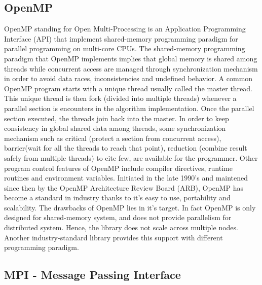 



\subsection{OpenMP}


OpenMP standing for Open Multi-Processing is an Application Programming Interface (API) that implement shared-memory programming paradigm for parallel programming on multi-core CPUs. The shared-memory programming paradigm that OpenMP implements implies that global memory is shared among threads while concurrent access are managed through synchronization mechanism in order to avoid data races, inconsistencies and undefined behavior. A common OpenMP program starts with a unique thread usually called the master thread. This unique thread is then fork (divided into multiple threads) whenever a parallel section is encounters in the algorithm implementation. Once the parallel section executed, the threads join back into the master. In order to keep consistency in global shared data among threads, some synchronization mechanism such as critical (protect a section from concurrent access), barrier(wait for all the threads to reach that point), reduction (combine result safely from multiple threads) to cite few, are available for the programmer. Other program control features of OpenMP include compiler directives, runtime routines and environment variables. Initiated in the late 1990's and maintened since then by the OpenMP Architecture Review Board (ARB), OpenMP has become a standard in industry thanks to it's easy to use, portability and scalability. The drawbacks of OpenMP lies in it's target. In fact OpenMP is only designed for shared-memory system, and does not provide parallelism for distributed system. Hence, the library does not scale across multiple nodes. Another industry-standard library provides this support with different programming paradigm.


\subsection{MPI - Message Passing Interface}

